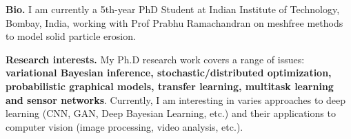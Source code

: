 %
%

\par{
{\textbf{Bio.}}
I am currently a 5th-year PhD Student at Indian Institute of Technology, Bombay, India,
 working with Prof Prabhu Ramachandran on meshfree methods to model solid particle erosion.

{\textbf{Research interests.}}
My Ph.D research work covers a range of issues: \textbf{variational Bayesian inference,
stochastic/distributed optimization, probabilistic graphical models, transfer learning, multitask learning
and sensor networks}. Currently, I am interesting in varies approaches to deep learning (CNN, GAN, Deep Bayesian Learning, etc.)
and their applications to computer vision (image processing, video analysis, etc.).
}
